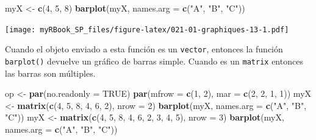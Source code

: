 \documentclass[
]{book}
\newenvironment{Shaded}{\begin{snugshade}}{\end{snugshade}}
\newcommand{\DataTypeTok}[1]{\textcolor[rgb]{0.13,0.29,0.53}{#1}}
\newcommand{\DecValTok}[1]{\textcolor[rgb]{0.00,0.00,0.81}{#1}}
\newcommand{\KeywordTok}[1]{\textcolor[rgb]{0.13,0.29,0.53}{\textbf{#1}}}
\newcommand{\NormalTok}[1]{#1}
\newcommand{\OtherTok}[1]{\textcolor[rgb]{0.56,0.35,0.01}{#1}}
\newcommand{\StringTok}[1]{\textcolor[rgb]{0.31,0.60,0.02}{#1}}
\begin{document}
\begin{Shaded}
\begin{Highlighting}[]
\NormalTok{myX <-}\StringTok{ }\KeywordTok{c}\NormalTok{(}\DecValTok{4}\NormalTok{, }\DecValTok{5}\NormalTok{, }\DecValTok{8}\NormalTok{)}
\KeywordTok{barplot}\NormalTok{(myX, }\DataTypeTok{names.arg =} \KeywordTok{c}\NormalTok{(}\StringTok{"A"}\NormalTok{, }\StringTok{"B"}\NormalTok{, }\StringTok{"C"}\NormalTok{))}
\end{Highlighting}
\end{Shaded}

\texttt{[image: myRBook\_SP\_files/figure-latex/021-01-graphiques-13-1.pdf]}

Cuando el objeto enviado a esta función es un \texttt{vector}, entonces la función \texttt{barplot()} devuelve un gráfico de barras simple. Cuando es un \texttt{matrix} entonces las barras son múltiples.

\begin{Shaded}
\begin{Highlighting}[]
\NormalTok{op <-}\StringTok{ }\KeywordTok{par}\NormalTok{(}\DataTypeTok{no.readonly =} \OtherTok{TRUE}\NormalTok{)}
\KeywordTok{par}\NormalTok{(}\DataTypeTok{mfrow =} \KeywordTok{c}\NormalTok{(}\DecValTok{1}\NormalTok{, }\DecValTok{2}\NormalTok{), }\DataTypeTok{mar =} \KeywordTok{c}\NormalTok{(}\DecValTok{2}\NormalTok{, }\DecValTok{2}\NormalTok{, }\DecValTok{1}\NormalTok{, }\DecValTok{1}\NormalTok{))}
\NormalTok{myX <-}\StringTok{ }\KeywordTok{matrix}\NormalTok{(}\KeywordTok{c}\NormalTok{(}\DecValTok{4}\NormalTok{, }\DecValTok{5}\NormalTok{, }\DecValTok{8}\NormalTok{, }\DecValTok{4}\NormalTok{, }\DecValTok{6}\NormalTok{, }\DecValTok{2}\NormalTok{), }\DataTypeTok{nrow =} \DecValTok{2}\NormalTok{)}
\KeywordTok{barplot}\NormalTok{(myX, }\DataTypeTok{names.arg =} \KeywordTok{c}\NormalTok{(}\StringTok{"A"}\NormalTok{, }\StringTok{"B"}\NormalTok{, }\StringTok{"C"}\NormalTok{))}
\NormalTok{myX <-}\StringTok{ }\KeywordTok{matrix}\NormalTok{(}\KeywordTok{c}\NormalTok{(}\DecValTok{4}\NormalTok{, }\DecValTok{5}\NormalTok{, }\DecValTok{8}\NormalTok{, }\DecValTok{4}\NormalTok{, }\DecValTok{6}\NormalTok{, }\DecValTok{2}\NormalTok{, }\DecValTok{3}\NormalTok{, }\DecValTok{4}\NormalTok{, }\DecValTok{5}\NormalTok{), }\DataTypeTok{nrow =} \DecValTok{3}\NormalTok{)}
\KeywordTok{barplot}\NormalTok{(myX, }\DataTypeTok{names.arg =} \KeywordTok{c}\NormalTok{(}\StringTok{"A"}\NormalTok{, }\StringTok{"B"}\NormalTok{, }\StringTok{"C"}\NormalTok{))}
\end{Highlighting}
\end{Shaded}
\end{document}
